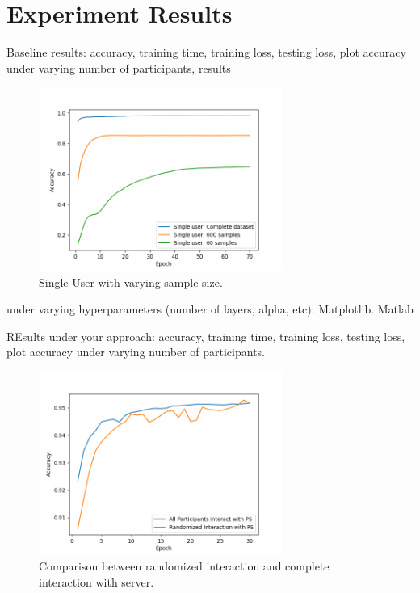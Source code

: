 \documentclass[conference]{IEEEtran}
\begin{document}



\section{Experiment Results}

Baseline results: accuracy, training time, training loss, testing loss, plot accuracy under varying number of participants, results

\begin{figure}[!h]
\includegraphics[width=8cm, keepaspectratio]{SingleUserBaselines}
\caption{Single User with varying sample size.}
\label{fig:SingleUser}
\end{figure}

under varying hyperparameters (number of layers, alpha, etc). Matplotlib. Matlab


REsults under your approach: accuracy, training time, training loss, testing loss, plot accuracy under varying number of participants.


\begin{figure}[!h]
\includegraphics[width=8cm, keepaspectratio]{RandomVsAll}
\caption{Comparison between randomized interaction and complete interaction with server. }
\label{fig:RandVsAll}
\end{figure}
\end{document}
